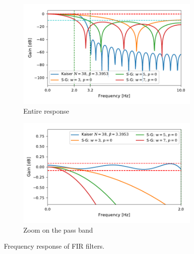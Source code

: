 \documentclass[a4paper,11pt]{article}
\begin{document}
\begin{figure}
    \centering
    \begin{subfigure}{\textwidth}
        \includegraphics{kaiser_win_freq-response.pdf}
        \caption{Entire response}
    \end{subfigure}

    \begin{subfigure}{\textwidth}
        \includegraphics{kaiser_win_freq-response_zoom.pdf}
        \caption{Zoom on the pass band}
        \label{fig:freq-response-zoom}
    \end{subfigure}
    \caption{Frequency response of FIR filters.}
    \label{fig:filter-freq-response}
\end{figure}
\end{document}
